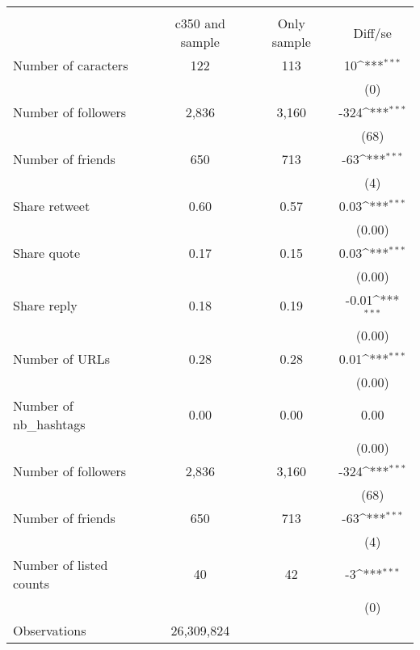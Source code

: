 {
\def\sym#1{\ifmmode^{#1}\else\(^{#1}\)\fi}
\begin{tabular}{l*{1}{ccc}}
\hline\hline
                    &\multicolumn{3}{c}{}                           \\
                    &c350 and sample& Only sample&     Diff/se         \\
\hline
Number of caracters &         122&         113&          10\sym{***}\\
                    &            &            &         (0)         \\
Number of followers &       2,836&       3,160&        -324\sym{***}\\
                    &            &            &        (68)         \\
Number of friends   &         650&         713&         -63\sym{***}\\
                    &            &            &         (4)         \\
Share retweet       &        0.60&        0.57&        0.03\sym{***}\\
                    &            &            &      (0.00)         \\
Share quote         &        0.17&        0.15&        0.03\sym{***}\\
                    &            &            &      (0.00)         \\
Share reply         &        0.18&        0.19&       -0.01\sym{***}\\
                    &            &            &      (0.00)         \\
Number of URLs      &        0.28&        0.28&        0.01\sym{***}\\
                    &            &            &      (0.00)         \\
Number of nb\_hashtags&        0.00&        0.00&        0.00         \\
                    &            &            &      (0.00)         \\
Number of followers &       2,836&       3,160&        -324\sym{***}\\
                    &            &            &        (68)         \\
Number of friends   &         650&         713&         -63\sym{***}\\
                    &            &            &         (4)         \\
Number of listed counts&          40&          42&          -3\sym{***}\\
                    &            &            &         (0)         \\
\hline
Observations        &  26,309,824&            &                     \\
\hline\hline
\end{tabular}
}
